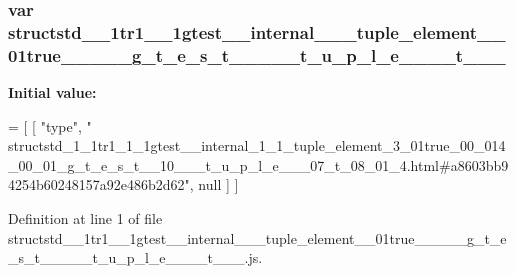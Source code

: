 \subsubsection[{\texorpdfstring{structstd\+\_\+1\+\_\+1tr1\+\_\+1\+\_\+1gtest\+\_\+\+\_\+internal\+\_\+1\+\_\+1\+\_\+tuple\+\_\+element\+\_\+3\+\_\+01true\+\_\+00\+\_\+014\+\_\+00\+\_\+01\+\_\+g\+\_\+t\+\_\+e\+\_\+s\+\_\+t\+\_\+\+\_\+10\+\_\+\+\_\+\+\_\+t\+\_\+u\+\_\+p\+\_\+l\+\_\+e\+\_\+\+\_\+\+\_\+07\+\_\+t\+\_\+08\+\_\+01\+\_\+4}{structstd_1_1tr1_1_1gtest__internal_1_1_tuple_element_3_01true_00_014_00_01_g_t_e_s_t__10___t_u_p_l_e___07_t_08_01_4}}]{\setlength{\rightskip}{0pt plus 5cm}var structstd\+\_\+\_\+1tr1\+\_\+\_\+1gtest\+\_\+\+\_\+internal\+\_\+\_\+\_\+tuple\+\_\+element\+\_\+\_\+01true\+\_\+\_\+\_\+\_\+\_\+g\+\_\+t\+\_\+e\+\_\+s\+\_\+t\+\_\+\+\_\+\_\+\+\_\+\+\_\+t\+\_\+u\+\_\+p\+\_\+l\+\_\+e\+\_\+\+\_\+\+\_\+\_\+t\+\_\+\_\+\_}\hypertarget{structstd__1__1tr1__1__1gtest____internal__1__1__tuple__element__3__01true__00__014__00__01__g__11dbff2d09393f3a57b3f1ab262e4837_aab3c88c68a87045523962aa2392512f3}{}\label{structstd__1__1tr1__1__1gtest____internal__1__1__tuple__element__3__01true__00__014__00__01__g__11dbff2d09393f3a57b3f1ab262e4837_aab3c88c68a87045523962aa2392512f3}
{\bfseries Initial value\+:}
\begin{DoxyCode}
=
[
    [ \textcolor{stringliteral}{"type"}, \textcolor{stringliteral}{"
      structstd\_1\_1tr1\_1\_1gtest\_\_internal\_1\_1\_tuple\_element\_3\_01true\_00\_014\_00\_01\_g\_t\_e\_s\_t\_\_10\_\_\_t\_u\_p\_l\_e\_\_\_07\_t\_08\_01\_4.html#a8603bb94254b60248157a92e486b2d62"}, null ]
]
\end{DoxyCode}


Definition at line 1 of file structstd\+\_\+\_\+1tr1\+\_\+\_\+1gtest\+\_\+\+\_\+internal\+\_\+\_\+\_\+tuple\+\_\+element\+\_\+\_\+01true\+\_\+\_\+\_\+\_\+\_\+g\+\_\+t\+\_\+e\+\_\+s\+\_\+t\+\_\+\+\_\+\_\+\+\_\+\+\_\+t\+\_\+u\+\_\+p\+\_\+l\+\_\+e\+\_\+\+\_\+\+\_\+\_\+t\+\_\+\_\+\_.\+js.

